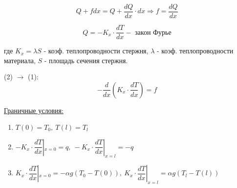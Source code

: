 	\begin{center}
	\end{center}
	
	\begin{equation}
		Q+fdx=Q+\frac{dQ}{dx}\cdot dx \Rightarrow f=\frac{dQ}{dx}
	\end{equation}
	
	\begin{equation}
		Q= -K_x \cdot \frac{dT}{dx} - \text{ закон Фурье}
	\end{equation}
	
	где $K_x=\lambda S$ - коэф. теплопроводности стержня, $\lambda$ - коэф. теплопроводности материала, 	$S$ - площадь сечения стержня.
	
	(2) $\rightarrow$ (1):
	\begin{equation}
	-\frac{d}{dx}(K_x \cdot \frac{dT}{dx}) = f
	\end{equation}
	
	\underline{Граничные условия:}
	\begin{enumerate}
		\item $T(0)=T_0, \ T(l)=T_l$
		\item $-K_x \cdot \dfrac{dT}{dx} |_{x=0} = q, \ -K_x \cdot \dfrac{dT}{dx} |_{x=l} = -q$
		\item $K_x \cdot  \dfrac{dT}{dx} |_{x=0} = -\alpha g (T_0 - T(0)), \ K_x \cdot \dfrac{dT}{dx} |_{x=l} = \alpha g (T_l - T(l))$
	\end{enumerate}
	
